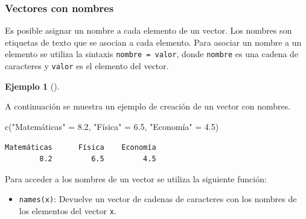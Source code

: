 \documentclass[
  a4paper,
]{scrreport}
\newenvironment{Shaded}{\begin{snugshade}}{\end{snugshade}}
\newcommand{\FloatTok}[1]{\textcolor[rgb]{0.68,0.00,0.00}{#1}}
\newcommand{\FunctionTok}[1]{\textcolor[rgb]{0.28,0.35,0.67}{#1}}
\newcommand{\NormalTok}[1]{\textcolor[rgb]{0.00,0.23,0.31}{#1}}
\newcommand{\OtherTok}[1]{\textcolor[rgb]{0.00,0.23,0.31}{#1}}
\newcommand{\StringTok}[1]{\textcolor[rgb]{0.13,0.47,0.30}{#1}}
\providecommand{\tightlist}{%
  \setlength{\itemsep}{0pt}\setlength{\parskip}{0pt}}\usepackage{longtable,booktabs,array}
\theoremstyle{definition}
\newtheorem{example}{Ejemplo}[chapter]
\theoremstyle{definition}
\theoremstyle{remark}
\begin{document}
\hypertarget{vectores-con-nombres}{%
\subsubsection{Vectores con nombres}\label{vectores-con-nombres}}

Es posible asignar un nombre a cada elemento de un vector. Los nombres
son etiquetas de texto que se asocian a cada elemento. Para asociar un
nombre a un elemento se utiliza la sintaxis \texttt{nombre\ =\ valor},
donde \texttt{nombre} es una cadena de caracteres y \texttt{valor} es el
elemento del vector.

\leavevmode{}%
\begin{example}[]\label{exm-vectores-con-nombre}

A continuación se muestra un ejemplo de creación de un vector con
nombres.

\begin{Shaded}
\begin{Highlighting}[]
\FunctionTok{c}\NormalTok{(}\StringTok{"Matemáticas"} \OtherTok{=} \FloatTok{8.2}\NormalTok{, }\StringTok{"Física"} \OtherTok{=} \FloatTok{6.5}\NormalTok{, }\StringTok{"Economía"} \OtherTok{=} \FloatTok{4.5}\NormalTok{)}
\end{Highlighting}
\end{Shaded}

\begin{verbatim}
Matemáticas      Física    Economía 
        8.2         6.5         4.5 
\end{verbatim}

\end{example}

Para acceder a los nombres de un vector se utiliza la siguiente función:

\begin{itemize}
\tightlist
\item
  \texttt{names(x)}: Devuelve un vector de cadenas de caracteres con los
  nombres de los elementos del vector \texttt{x}.
\end{itemize}
\end{document}
